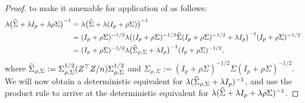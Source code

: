 \documentclass{article}
\begin{document}
\begin{proof}
    to make it amenable
    for application of 
    as follows:
   \begin{align}
        \lambda
        \big({\widehat{\Sigma}} + \lambda I_p + \lambda \rho \Sigma\big)^{-1}
        &=
        \lambda
        \big({\widehat{\Sigma}} + \lambda (I_p + \rho \Sigma)\big)^{-1} 
        \nonumber \\
        &=
        (I_p + \rho \Sigma)^{-1/2}
        \lambda\big((I_p + \rho \Sigma)^{-1/2} {\widehat{\Sigma}} (I_p + \rho \Sigma)^{-1/2} + \lambda I_p\big)^{-1}
        (I_p + \rho \Sigma)^{-1/2} 
        \nonumber \\
        &=
        (I_p + \rho \Sigma)^{-1/2}
        \lambda
        \big(
        {\widehat{\Sigma}}_{\rho, \Sigma} + \lambda I_p
        \big)^{-1}
        (I_p + \rho \Sigma)^{-1/2}, \label{eq:resolvent-massage-genbias-ridge}
   \end{align}
   where ${\widehat{\Sigma}}_{\rho, \Sigma} := \Sigma_{\rho, \Sigma}^{1/2} (Z^\top Z / n) \Sigma_{\rho, \Sigma}^{1/2}$
   and $\Sigma_{\rho, \Sigma} := (I_p + \rho \Sigma)^{-1/2} \Sigma (I_p + \rho \Sigma)^{-1/2}$.
   We will now obtain a deterministic equivalent
   for $\lambda ({\widehat{\Sigma}}_{\rho, \Sigma} + \lambda I_p)^{-1}$,
   and use the product rule to arrive at the deterministic
   equivalent for $\lambda ({\widehat{\Sigma}} + \lambda I_p + \lambda \rho \Sigma)^{-1}$.
   

\end{proof}
\end{document}

